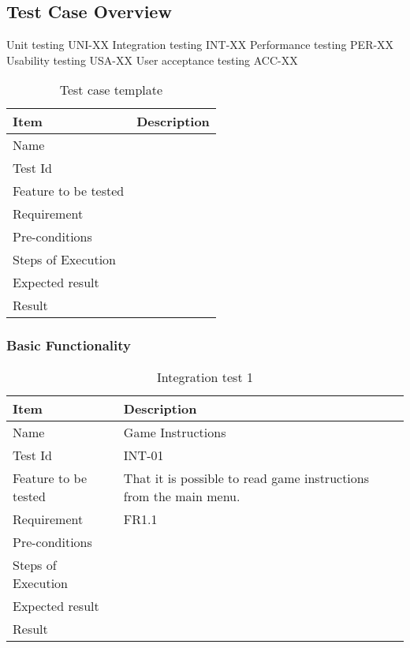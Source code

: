 
\subsection{Test Case Overview}

Unit testing UNI-XX
Integration testing INT-XX
Performance testing PER-XX
Usability testing USA-XX
User acceptance testing ACC-XX

\begin{table}[H]
\centering
	\begin{tabular}{ l | l }
		\hline
		{\bf Item} & {\bf Description} \\ \hline
		Name & \\ 
		Test Id & \\ 
		Feature to be tested & \\ 
		Requirement & \\ 
		Pre-conditions & \\ 
		Steps of Execution & \\ 
		Expected result & \\ 
		Result & \\ 
	\end{tabular}
	\caption{Test case template}
\end{table}

\subsubsection{Basic Functionality}

\begin{table}[H]
\centering
	\begin{tabular}{ l | p{8cm} }
		\hline
		{\bf Item} & {\bf Description} \\ \hline
		Name & Game Instructions \\ 
		Test Id & INT-01 \\ 
		Feature to be tested & That it is possible to read game instructions from the main menu. \\ 
		Requirement & FR1.1 \\ 
		Pre-conditions & \\ 
		Steps of Execution & \\ 
		Expected result & \\ 
		Result & \\ 		
	\end{tabular}
	\caption{Integration test 1}
\end{table}

